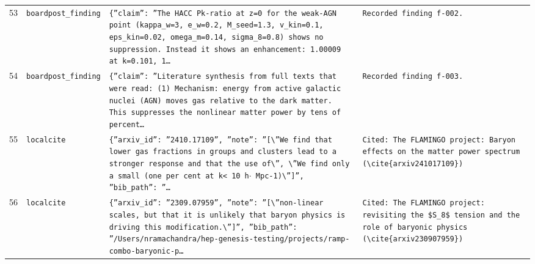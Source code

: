 \documentclass[11pt,a4paper]{article}
\begin{document}
\begin{longtable}{@{}p{}p{}p{}p{}@{}}
53 & \texttt{board}\newline\texttt{post\_\allowbreak{}finding} & \texttt{\{''claim'':\allowbreak{} ''The HACC Pk-ratio at z=\allowbreak{}0 for the weak-AGN point (kappa\_\allowbreak{}w=\allowbreak{}3,\allowbreak{} e\_\allowbreak{}w=\allowbreak{}0.2,\allowbreak{} M\_\allowbreak{}seed=\allowbreak{}1.3,\allowbreak{} v\_\allowbreak{}kin=\allowbreak{}0.1,\allowbreak{} eps\_\allowbreak{}kin=\allowbreak{}0.02,\allowbreak{} omega\_\allowbreak{}m=\allowbreak{}0.14,\allowbreak{} sigma\_\allowbreak{}8=\allowbreak{}0.8)\allowbreak{} shows no suppression. Instead it shows an enhancement:\allowbreak{} 1.00009 at k=\allowbreak{}0.101,\allowbreak{} 1\ldots{}\allowbreak{}} & \texttt{Recorded finding f-002.} \\
54 & \texttt{board}\newline\texttt{post\_\allowbreak{}finding} & \texttt{\{''claim'':\allowbreak{} ''Literature synthesis from full texts that were read:\allowbreak{} (1)\allowbreak{} Mechanism:\allowbreak{} energy from active galactic nuclei (AGN)\allowbreak{} moves gas relative to the dark matter. This suppresses the nonlinear matter power by tens of percent\ldots{}\allowbreak{}} & \texttt{Recorded finding f-003.} \\
55 & \texttt{local}\newline\texttt{cite} & \texttt{\{''arxiv\_\allowbreak{}id'':\allowbreak{} ''2410.17109'',\allowbreak{} ''note'':\allowbreak{} ''[\textbackslash{}\allowbreak{}''We find that lower gas fractions in groups and clusters lead to a stronger response and that the use of\textbackslash{}\allowbreak{}'',\allowbreak{} \textbackslash{}\allowbreak{}''We find only a small (one per cent at k\textless{}\allowbreak{} 10 h$\cdot$ Mpc-1)\allowbreak{}\textbackslash{}\allowbreak{}'']\allowbreak{}'',\allowbreak{} ''bib\_\allowbreak{}path'':\allowbreak{} ''\ldots{}\allowbreak{}} & \texttt{Cited:\allowbreak{} The FLAMINGO project:\allowbreak{} Baryon effects on the matter power spectrum (\textbackslash{}\allowbreak{}cite\{arxiv241017109\}\allowbreak{})\allowbreak{}} \\
56 & \texttt{local}\newline\texttt{cite} & \texttt{\{''arxiv\_\allowbreak{}id'':\allowbreak{} ''2309.07959'',\allowbreak{} ''note'':\allowbreak{} ''[\textbackslash{}\allowbreak{}''non-linear scales,\allowbreak{} but that it is unlikely that baryon physics is driving this modification.\textbackslash{}\allowbreak{}'']\allowbreak{}'',\allowbreak{} ''bib\_\allowbreak{}path'':\allowbreak{} ''/\allowbreak{}Users/\allowbreak{}nramachandra/\allowbreak{}hep-genesis-testing/\allowbreak{}projects/\allowbreak{}ramp-combo-baryonic-p\ldots{}\allowbreak{}} & \texttt{Cited:\allowbreak{} The FLAMINGO project:\allowbreak{} revisiting the \$S\_\allowbreak{}8\$ tension and the role of baryonic physics (\textbackslash{}\allowbreak{}cite\{arxiv230907959\}\allowbreak{})\allowbreak{}} \\

\end{longtable}
\end{document}

